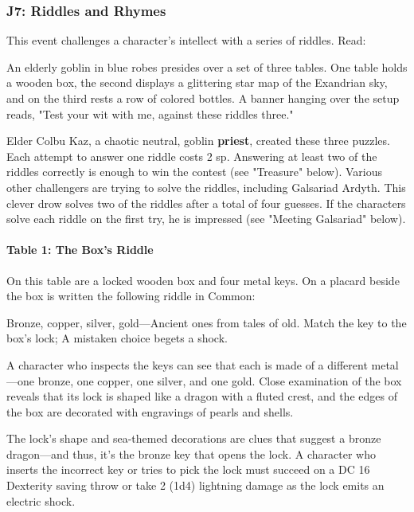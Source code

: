 \documentclass[a4paper, 11pt, bg=full, twocolumn, nooutline]{dndbook}
\begin{document}
\subsubsection{J7: Riddles and Rhymes}

This event challenges a character's intellect with a series of riddles. Read:

\begin{DndReadAloud}
An elderly goblin in blue robes presides over a set of three tables. One table holds a wooden box, the second displays a glittering star map of the Exandrian sky, and on the third rests a row of colored bottles. A banner hanging over the setup reads, "Test your wit with me, against these riddles three."
\end{DndReadAloud}

Elder Colbu Kaz, a chaotic neutral, goblin \textbf{priest}, created these three puzzles. Each attempt to answer one riddle costs 2 sp. Answering at least two of the riddles correctly is enough to win the contest (see "Treasure" below). Various other challengers are trying to solve the riddles, including Galsariad Ardyth. This clever drow solves two of the riddles after a total of four guesses. If the characters solve each riddle on the first try, he is impressed (see "Meeting Galsariad" below).

\paragraph{Table 1: The Box's Riddle}

On this table are a locked wooden box and four metal keys. On a placard beside the box is written the following riddle in Common:

\begin{DndReadAloud}
Bronze, copper, silver, gold---Ancient ones from tales of old. Match the key to the box's lock; A mistaken choice begets a shock.
\end{DndReadAloud}

A character who inspects the keys can see that each is made of a different metal---one bronze, one copper, one silver, and one gold. Close examination of the box reveals that its lock is shaped like a dragon with a fluted crest, and the edges of the box are decorated with engravings of pearls and shells.

The lock's shape and sea-themed decorations are clues that suggest a bronze dragon---and thus, it's the bronze key that opens the lock. A character who inserts the incorrect key or tries to pick the lock must succeed on a DC 16 Dexterity saving throw or take 2 (1d4) lightning damage as the lock emits an electric shock.
\end{document}
